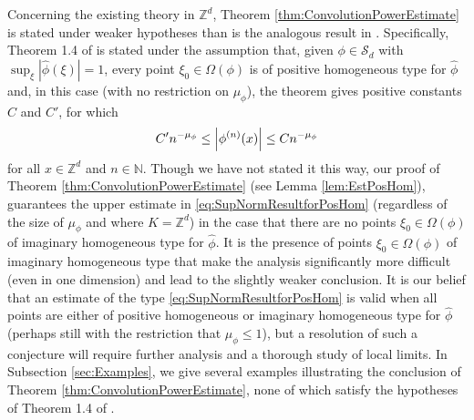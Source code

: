 \documentclass[11pt, letter]{book}
\begin{document}
\noindent Concerning the existing theory in $\mathbb{Z}^d$, Theorem \ref{thm:ConvolutionPowerEstimate} is stated under weaker hypotheses than is the analogous result in \cite{randles_convolution_2017}. Specifically, Theorem 1.4 of \cite{randles_convolution_2017} is stated under the assumption that, given $\phi\in\mathcal{S}_d$ with $\sup_{\xi}|\widehat{\phi}(\xi)|=1$, every point $\xi_0\in\Omega(\phi)$ is of positive homogeneous type for $\widehat{\phi}$ and, in this case (with no restriction on $\mu_\phi$), the theorem gives positive constants $C$ and $C'$, for which
\begin{equation}\label{eq:SupNormResultforPosHom}
    C'n^{-\mu_\phi}\leq \abs{\phi^{(n)}(x)}\leq C n^{-\mu_\phi}
\end{equation}
for all $x\in\mathbb{Z}^d$ and $n\in\mathbb{N}$. Though we have not stated it this way, our proof of Theorem \ref{thm:ConvolutionPowerEstimate} (see Lemma \ref{lem:EstPosHom}), guarantees the upper estimate in \eqref{eq:SupNormResultforPosHom} (regardless of the size of $\mu_\phi$ and where $K=\mathbb{Z}^d$) in the case that there are no points $\xi_0\in\Omega(\phi)$ of imaginary homogeneous type for $\widehat{\phi}$. It is the presence of points $\xi_0\in\Omega(\phi)$ of imaginary homogeneous type that make the analysis significantly more difficult (even in one dimension) and lead to the slightly weaker conclusion. It is our belief that an estimate of the type \eqref{eq:SupNormResultforPosHom} is valid when all points are either of positive homogeneous or imaginary homogeneous type for $\widehat\phi$ (perhaps still with the restriction that $\mu_\phi\leq 1$), but a resolution of such a conjecture will require further analysis and a thorough study of local limits. In Subsection \ref{sec:Examples}, we give several examples illustrating the conclusion of Theorem \ref{thm:ConvolutionPowerEstimate}, none of which satisfy the hypotheses of Theorem 1.4 of \cite{randles_convolution_2017}.\\
\end{document}
